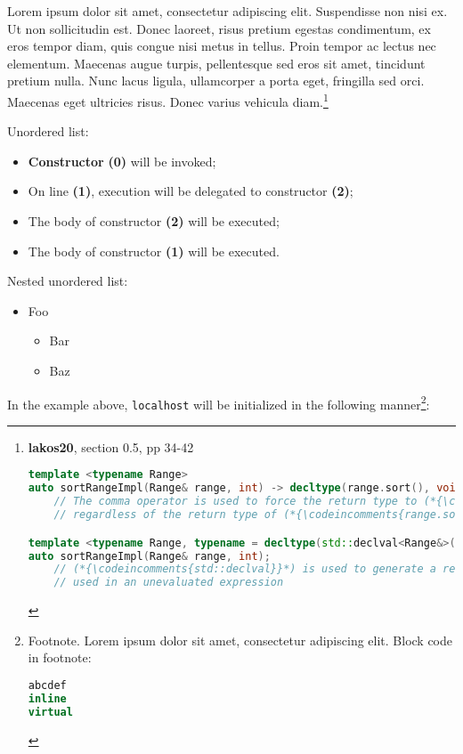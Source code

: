 \documentclass[twoside,10pt,letterpaper,usenames]{newstyle-PearsonGeneric-7-38}
\newcommand{\codeincomments}{\color{skyblue}\ttfamily}
\begin{document}
Lorem ipsum dolor sit amet, consectetur adipiscing elit. Suspendisse non
nisi ex. Ut non sollicitudin est. Donec laoreet, risus pretium egestas
condimentum, ex eros tempor diam, quis congue nisi metus in tellus.
Proin tempor ac lectus nec elementum. Maecenas augue turpis,
pellentesque sed eros sit amet, tincidunt pretium nulla. Nunc lacus
ligula, ullamcorper a porta eget, fringilla sed orci. Maecenas eget
ultricies risus. Donec varius vehicula diam.{\cprotect\footnote{\textbf{lakos20},
section 0.5, pp 34-42

\begin{lstlisting}[language=C++, basicstyle={\ttfamily\footnotesize}]
template <typename Range>
auto sortRangeImpl(Range& range, int) -> decltype(range.sort(), void());
    // The comma operator is used to force the return type to (*{\codeincomments{void}}*),
    // regardless of the return type of (*{\codeincomments{range.sort()}}*).

template <typename Range, typename = decltype(std::declval<Range&>().sort()>
auto sortRangeImpl(Range& range, int);
    // (*{\codeincomments{std::declval}}*) is used to generate a reference to (*{\codeincomments{Range}}*) that can be
    // used in an unevaluated expression
\end{lstlisting}
    }}

Unordered list:

\begin{itemize}
\item{\textbf{Constructor} \textbf{(0)} will be invoked;}
\item{On line \textbf{(1)}, execution will be delegated to constructor \textbf{(2)};}
\item{The body of constructor \textbf{(2)} will be executed;}
\item{The body of constructor \textbf{(1)} will be executed.}
\end{itemize}

Nested unordered list:

\begin{itemize}
\item{Foo\begin{itemize}
\item{Bar}
\item{Baz}
\end{itemize}
}
\end{itemize}

In the example above, \texttt{localhost} will be initialized in the
following manner{\cprotect\footnote{Footnote. Lorem ipsum dolor sit
amet, consectetur adipiscing elit. Block code in footnote:

\begin{lstlisting}[language=C++, basicstyle={\ttfamily\footnotesize}]
abcdef
inline
virtual
\end{lstlisting}
    }}:
\end{document}
